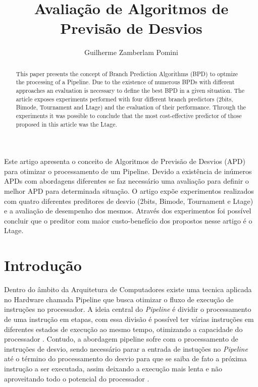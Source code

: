 \documentclass[12pt]{article}
\title{Avaliação de Algoritmos de Previsão de Desvios}
\author{Guilherme Zamberlam Pomini\inst{1}}
\begin{document}
 

\maketitle

\begin{abstract}
  This paper presents the concept of Branch Prediction Algorithms (BPD) to optmize the processing of a Pipeline. Due to the existence of numerous BPDs with different approaches an evaluation is necessary to define the best BPD in a given situation. The article exposes experiments performed with four different branch predictors (2bits, Bimode, Tournament and Ltage) and the evaluation of their performance. Through the experiments it was possible to conclude that the most cost-effective predictor of those proposed in this article was the Ltage.
\end{abstract}
     
\begin{resumo} 
  Este artigo apresenta o conceito de Algoritmos de Previsão de Desvios (APD) para otimizar o processamento de um Pipeline. Devido a existência de inúmeros APDs com abordagens diferentes se faz necessário uma avaliação para definir o melhor APD para determinada situação. O artigo expõe experimentos realizados com quatro diferentes preditores de desvio (2bits, Bimode, Tournament e Ltage) e a avaliação de desempenho dos mesmos. Através dos experimentos foi possível concluir que o preditor com maior custo-benefício dos propostos nesse artigo é o Ltage.
\end{resumo}

\section{Introdução}

Dentro do âmbito da Arquitetura de Computadores existe uma tecnica aplicada no Hardware chamada Pipeline que busca otimizar o fluxo de execução de instruções no processador. A ideia central do \textit{Pipeline} é dividir o processamento de uma instrução em etapas, com essa divisão é possível ter várias instruções em diferentes estados de execução ao mesmo tempo, otimizando a capacidade do processador \cite{dal2005previsao}. Contudo, a abordagem pipeline sofre com o processamento de instruções de desvio, sendo necessário parar a entrada de instuções no \textit{Pipeline} até o término do processamento do desvio para que se saiba de fato a próxima instrução a ser executada, assim deixando a execução mais lenta e não aproveitando todo o potencial do processador \cite{Patterson:1990:CAQ:77493}.
\end{document}
